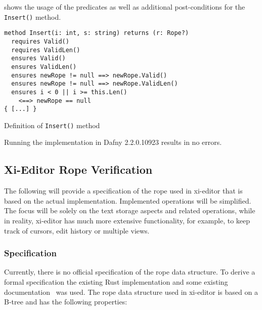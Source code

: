  shows the usage of the predicates as well as additional post-conditions for the \texttt{Insert()} method.

\begin{listing}[h!]
\begin{verbatim}
method Insert(i: int, s: string) returns (r: Rope?)
  requires Valid()
  requires ValidLen()
  ensures Valid()
  ensures ValidLen()
  ensures newRope != null ==> newRope.Valid()
  ensures newRope != null ==> newRope.ValidLen()
  ensures i < 0 || i >= this.Len()
    <==> newRope == null
{ [...] }
\end{verbatim}
    \caption{Definition of \texttt{Insert()} method}
    \label{lst:insert}
\end{listing}

Running the implementation in Dafny 2.2.0.10923 results in no errors.


\subsection{Xi-Editor Rope Verification}

The following will provide a specification of the rope used in xi-editor that is based on the actual implementation.
Implemented operations will be simplified.
The focus will be solely on the text storage aspects and related operations, while in reality, xi-editor has much more extensive functionality, for example, to keep track of cursors, edit history or multiple views.

\subsubsection{Specification}

Currently, there is no official specification of the rope data structure.
To derive a formal specification the existing Rust implementation and some existing documentation~\cite{xi-rope} was used.
The rope data structure used in xi-editor is based on a B-tree and has the following properties:

